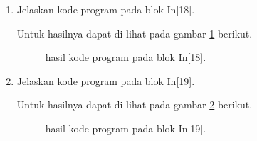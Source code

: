 \begin{enumerate}
\item Jelaskan kode program pada blok  In[18].

Untuk hasilnya dapat di lihat pada gambar \ref{c158} berikut.
\begin{figure}[!htbp]
      \caption{hasil kode program pada blok  In[18].}
      \label{c158}
      \end{figure}

\item Jelaskan kode program pada blok  In[19].

Untuk hasilnya dapat di lihat pada gambar \ref{c159} berikut.
\begin{figure}[!htbp]
      \caption{hasil kode program pada blok  In[19].}
      \label{c159}
      \end{figure}


\end{enumerate}
